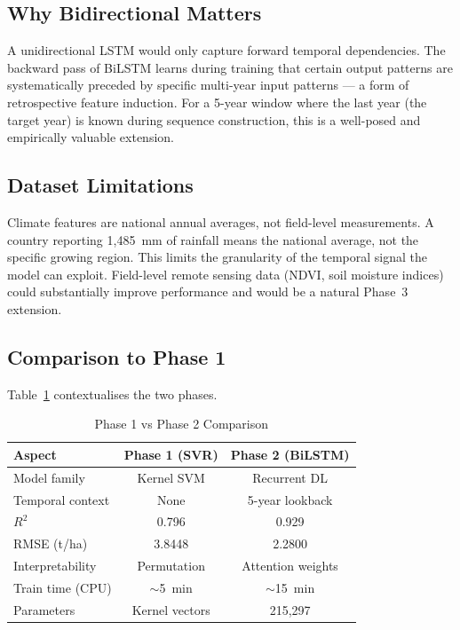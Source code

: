 \documentclass[conference]{IEEEtran}
\begin{document}
\subsection{Why Bidirectional Matters}
A unidirectional LSTM would only capture forward temporal dependencies.
The backward pass of BiLSTM learns during training that certain output patterns
are systematically preceded by specific multi-year input patterns —
a form of retrospective feature induction.
For a 5-year window where the last year (the target year) is known during sequence
construction, this is a well-posed and empirically valuable extension.

\subsection{Dataset Limitations}
Climate features are national annual averages, not field-level measurements.
A country reporting 1,485~mm of rainfall means the national average, not the
specific growing region.
This limits the granularity of the temporal signal the model can exploit.
Field-level remote sensing data (NDVI, soil moisture indices) could substantially
improve performance and would be a natural Phase~3 extension.

\subsection{Comparison to Phase 1}
Table~\ref{tab:phases} contextualises the two phases.

\begin{table}[H]
\caption{Phase 1 vs Phase 2 Comparison}
\label{tab:phases}
\centering
\begin{tabular}{lcc}
\toprule
\textbf{Aspect}        & \textbf{Phase 1 (SVR)} & \textbf{Phase 2 (BiLSTM)} \\
\midrule
Model family           & Kernel SVM     & Recurrent DL \\
Temporal context       & None           & 5-year lookback \\
$R^2$                  & 0.796          & 0.929 \\
RMSE (t/ha)            & 3.8448         & 2.2800 \\
Interpretability       & Permutation    & Attention weights \\
Train time (CPU)       & $\sim$5~min    & $\sim$15~min \\
Parameters             & Kernel vectors & 215,297 \\
\bottomrule
\end{tabular}
\end{table}
\end{document}
